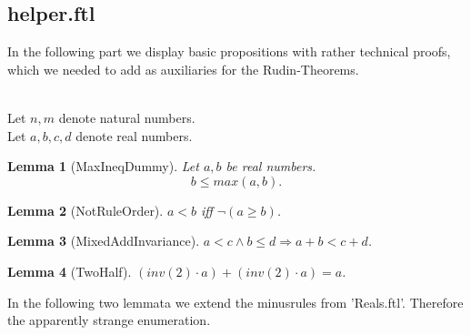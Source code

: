 \documentclass{article}
\newenvironment{forthel}{\begin{leftbar}}{\end{leftbar}}
\newtheorem{lemma}{Lemma}
\begin{document}
\subsection{helper.ftl}
In the following part we display basic propositions with rather technical proofs, which we needed to add as auxiliaries for the Rudin-Theorems.

\begin{forthel}
	\\
	Let $n,m$ denote natural numbers.\\
	Let $a,b,c,d$ denote real numbers.
	
	
	
	\begin{lemma}[MaxIneqDummy]
	Let $a,b$ be real numbers. $$b \leq max(a,b).$$
	\end{lemma}
	
	\begin{lemma}[NotRuleOrder]
	$a < b$ iff $\neg(a \geq b)$.
	\end{lemma}
	
	\begin{lemma}[MixedAddInvariance]
	$a < c \wedge b \leq d \Rightarrow a + b < c + d$.
	\end{lemma}
	
	\begin{lemma}[TwoHalf]
	$(inv(2) \cdot a) + (inv(2) \cdot a) = a$.
	\end{lemma}
	
\end{forthel}

\noindent In the following two lemmata we extend the minusrules from 'Reals.ftl'. Therefore the apparently strange enumeration.
\end{document}
